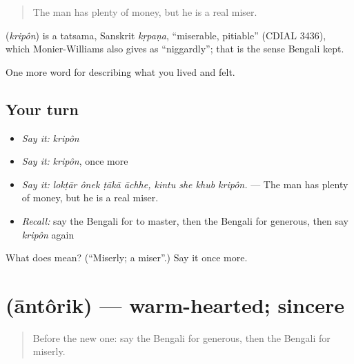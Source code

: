 \begin{quote}
The man has plenty of money, but he is a real miser.
\end{quote}

\begin{cousinweb}
\textbf{} (\emph{kripôn}) is a tatsama, Sanskrit \emph{kṛpaṇa}, \textquotedblleft{}miserable, pitiable\textquotedblright{} (CDIAL 3436), which Monier-Williams also gives as \textquotedblleft{}niggardly\textquotedblright{}; that is the sense Bengali kept.
\end{cousinweb}

\begin{grammarlens}[title={What you've built}]
One more word for describing what you lived and felt.
\end{grammarlens}

\subsection*{Your turn}
\begin{itemize}
\raggedright
  \item \emph{Say it:} \emph{kripôn}
  \item \emph{Say it:} \emph{kripôn}, once more
  \item \emph{Say it:} \emph{lokṭār ônek ṭākā āchhe, kintu she khub kripôn.} — The man has plenty of money, but he is a real miser.
  \item \emph{Recall:} say the Bengali for to master, then the Bengali for generous, then say \emph{kripôn} again
\end{itemize}

\begin{tcolorbox}[breakable,colback=teal!4,colframe=teal!35!black,title={Before you move on}]
What does  mean? (\textquotedblleft{}Miserly; a miser\textquotedblright{}.) Say it once more.
\end{tcolorbox}
\section[\texorpdfstring{\bn{আন্তরিক} (āntôrik)}{আন্তরিক (āntôrik)}]{ (āntôrik) — warm-hearted; sincere}

\label{lesson:BN-C457-antorik}



\begin{quote}
Before the new one: say the Bengali for generous, then the Bengali for miserly.
\end{quote}

